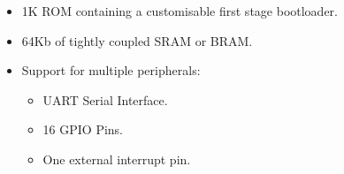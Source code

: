 \begin{itemize}
\item 1K ROM containing a customisable first stage bootloader.

\item 64Kb of tightly coupled SRAM or BRAM.

\item Support for multiple peripherals:

    \begin{itemize}
    \item UART Serial Interface.
    \item 16 GPIO Pins.
    \item One external interrupt pin.
    \end{itemize}

\end{itemize}

